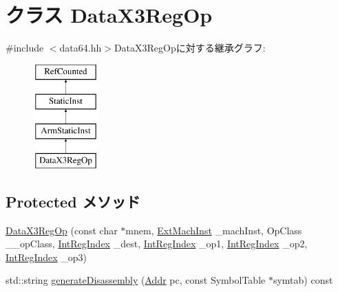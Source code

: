 \hypertarget{classArmISA_1_1DataX3RegOp}{
\section{クラス DataX3RegOp}
\label{classArmISA_1_1DataX3RegOp}
}


{\ttfamily \#include $<$data64.hh$>$}DataX3RegOpに対する継承グラフ:\begin{figure}[H]
\begin{center}
\leavevmode
\includegraphics[height=4cm]{classArmISA_1_1DataX3RegOp}
\end{center}
\end{figure}
\subsection*{Protected メソッド}
\begin{DoxyCompactItemize}
\item 
\hyperlink{classArmISA_1_1DataX3RegOp_adf6274b523e6bdab334965b174377c6e}{DataX3RegOp} (const char $\ast$mnem, \hyperlink{classStaticInst_a5605d4fc727eae9e595325c90c0ec108}{ExtMachInst} \_\-machInst, OpClass \_\-\_\-opClass, \hyperlink{namespaceArmISA_ae64680ba9fb526106829d6bf92fc791b}{IntRegIndex} \_\-dest, \hyperlink{namespaceArmISA_ae64680ba9fb526106829d6bf92fc791b}{IntRegIndex} \_\-op1, \hyperlink{namespaceArmISA_ae64680ba9fb526106829d6bf92fc791b}{IntRegIndex} \_\-op2, \hyperlink{namespaceArmISA_ae64680ba9fb526106829d6bf92fc791b}{IntRegIndex} \_\-op3)
\item 
std::string \hyperlink{classArmISA_1_1DataX3RegOp_a95d323a22a5f07e14d6b4c9385a91896}{generateDisassembly} (\hyperlink{classm5_1_1params_1_1Addr}{Addr} pc, const SymbolTable $\ast$symtab) const 
\end{DoxyCompactItemize}
